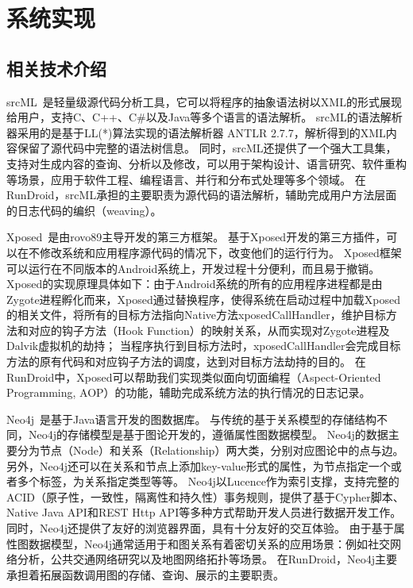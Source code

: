 \chapter{系统实现 }
\label{chp:implement}


\section{相关技术介绍}



srcML~\cite{collard2013srcml}是轻量级源代码分析工具，它可以将程序的抽象语法树以XML的形式展现给用户，支持C、C++、C\#以及Java等多个语言的语法解析。
srcML的语法解析器采用的是基于LL(*)算法实现的语法解析器 ANTLR 2.7.7，解析得到的XML内容保留了源代码中完整的语法树信息。
同时，srcML还提供了一个强大工具集，支持对生成内容的查询、分析以及修改，可以用于架构设计、语言研究、软件重构等场景，应用于软件工程、编程语言、并行和分布式处理等多个领域。
在RunDroid，srcML承担的主要职责为源代码的语法解析，辅助完成用户方法层面的日志代码的编织（weaving）。



Xposed~\cite{Xposed}是由rovo89主导开发的第三方框架。
基于Xposed开发的第三方插件，可以在不修改系统和应用程序源代码的情况下，改变他们的运行行为。
Xposed框架可以运行在不同版本的Android系统上，开发过程十分便利，而且易于撤销。
Xposed的实现原理具体如下：由于Android系统的所有的应用程序进程都是由Zygote进程孵化而来，Xposed通过替换程序，使得系统在启动过程中加载Xposed的相关文件，将所有的目标方法指向Native方法xposedCallHandler，维护目标方法和对应的钩子方法（Hook Function）的映射关系，从而实现对Zygote进程及Dalvik虚拟机的劫持；
当程序执行到目标方法时，xposedCallHandler会完成目标方法的原有代码和对应钩子方法的调度，达到对目标方法劫持的目的。
在RunDroid中，Xposed可以帮助我们实现类似面向切面编程（Aspect-Oriented Programming, AOP）的功能，辅助完成系统方法的执行情况的日志记录。


Neo4j~\cite{Neo4jthe19}是基于Java语言开发的图数据库。
与传统的基于关系模型的存储结构不同，Neo4j的存储模型是基于图论开发的，遵循属性图数据模型。
Neo4j的数据主要分为节点（Node）和关系（Relationship）两大类，分别对应图论中的点与边。
另外，Neo4j还可以在关系和节点上添加key-value形式的属性，为节点指定一个或者多个标签，为关系指定类型等等。
Neo4j以Lucence作为索引支撑，支持完整的 ACID（原子性，一致性，隔离性和持久性）事务规则，提供了基于Cypher脚本、Native Java API和REST Http API等多种方式帮助开发人员进行数据开发工作。
同时，Neo4j还提供了友好的浏览器界面，具有十分友好的交互体验。
由于基于属性图数据模型，Neo4j通常适用于和图关系有着密切关系的应用场景：例如社交网络分析，公共交通网络研究以及地图网络拓扑等场景。
在RunDroid，Neo4j主要承担着拓展函数调用图的存储、查询、展示的主要职责。


